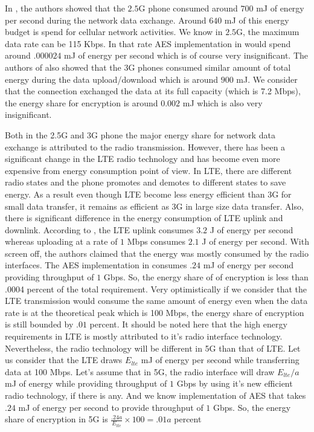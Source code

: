 \documentclass[lnicst,sechang,a4paper]{svmultln}
\begin{document}
In \cite{Usenix_2010}, the authors showed that the $2.5$G phone consumed around $700$ mJ of energy per second during the network data exchange. Around $640$ mJ of this energy budget is spend for cellular network activities. We know in $2.5$G, the maximum data rate can be 115 Kbps. In that rate AES implementation in \cite{Ruhr_2011} would spend around $.000024$ mJ of energy per second which is of course very insignificant. The authors of \cite{Usenix_2010} also showed that the 3G phones consumed similar amount of total energy during the data upload/download which is around $900$ mJ. We consider that the connection exchanged the data at its full capacity (which is 7.2 Mbps), the energy share for encryption is around $0.002$ mJ which is also very insignificant. 

Both in the 2.5G and 3G phone the major energy share for network data exchange is attributed to the radio transmission. However, there has been a significant change in the LTE radio technology and has become even more expensive from energy consumption point of view. In LTE, there are different radio states and the phone promotes and demotes to different states to save energy. As a result even though LTE become less energy efficient than 3G for small data transfer, it remains as efficient as 3G in large size data transfer. Also, there is significant difference in the energy consumption of LTE uplink and downlink. According to \cite{Mobisys_2012}, the LTE uplink consumes $3.2$ J of energy per second whereas uploading at a rate of $1$ Mbps consumes $2.1$ J of energy per second. With screen off, the authors claimed that the energy was mostly consumed by the radio interfaces. The AES implementation in \cite{Ruhr_2011} consumes $.24$ mJ of energy per second providing throughput of $1$ Gbps. So, the energy share of of encryption is less than .0004 percent of the total requirement. Very optimistically if we consider that the LTE transmission would consume the same amount of energy even when the data rate is at the theoretical peak which is 100 Mbps, the energy share of encryption is still bounded by $.01$ percent. It should be noted here that the high energy requirements in LTE is mostly attributed to it's radio interface technology. Nevertheless, the radio technology will be different in 5G than that of LTE. Let us consider that the LTE draws $E_{lte}$ mJ of energy per second while transferring data at 100 Mbps. Let's assume that in 5G, the radio interface will draw $E_{lte}/a$ mJ of energy while providing throughput of $1$ Gbps by using it's new efficient radio technology, if there is any. And we know implementation of AES that takes $.24$ mJ of energy per second to provide throughput of $1$ Gbps. So, the energy share of encryption in 5G is $\frac{.24a}{E_{lte}}\times 100 = .01a$ percent
\end{document}
